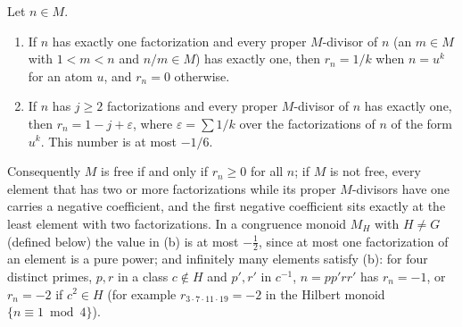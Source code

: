 \begin{theorem}\label{thm:formallog}
Let $n\in M$.
\begin{enumerate}[label=(\alph*)]
\item If $n$ has exactly one factorization and every proper $M$-divisor of $n$ (an $m\in M$ with $1<m<n$ and $n/m\in M$) has exactly one, then $r_n=1/k$ when $n=u^k$ for an atom $u$, and $r_n=0$ otherwise.
\item If $n$ has $j\ge2$ factorizations and every proper $M$-divisor of $n$ has exactly one, then $r_n=1-j+\varepsilon$, where $\varepsilon=\sum1/k$ over the factorizations of $n$ of the form $u^k$. This number is at most $-1/6$.
\end{enumerate}
Consequently $M$ is free if and only if $r_n\ge0$ for all $n$; if $M$ is not free, every element that has two or more factorizations while its proper $M$-divisors have one carries a negative coefficient, and the first negative coefficient sits exactly at the least element with two factorizations. In a congruence monoid $M_H$ with $H\ne G$ (defined below) the value in (b) is at most $-\tfrac12$, since at most one factorization of an element is a pure power; and infinitely many elements satisfy (b): for four distinct primes, $p,r$ in a class $c\notin H$ and $p',r'$ in $c^{-1}$, $n=pp'rr'$ has $r_n=-1$, or $r_n=-2$ if $c^2\in H$ (for example $r_{3\cdot7\cdot11\cdot19}=-2$ in the Hilbert monoid $\{n\equiv1\bmod4\}$).
\end{theorem}

